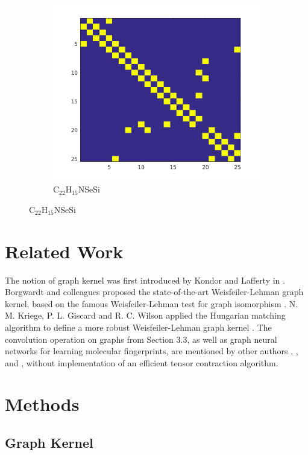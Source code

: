 \documentclass[a4paper]{article}
\begin{document}
\begin{figure}[h]
\begin{subfigure}[h]{0.3\columnwidth}
	\includegraphics[width=\textwidth]{adjacency2}
	\caption{C$_{22}$H$_{15}$NSeSi}
\end{subfigure}
\end{figure}

\section{Related Work}

The notion of graph kernel was first introduced by Kondor and Lafferty in \cite{Risi}. Borgwardt and colleagues proposed the state-of-the-art Weisfeiler-Lehman graph kernel, based on the famous Weisfeiler-Lehman test for graph isomorphism \cite{Nino}. N. M. Kriege, P. L. Giscard and R. C. Wilson applied the Hungarian matching algorithm to define a more robust Weisfeiler-Lehman graph kernel \cite{Nils}. The convolution operation on graphs from Section 3.3, as well as graph neural networks for learning molecular fingerprints, are mentioned by other authors \cite{Steven}, \cite{Duvenaud}, and \cite{Thomas}, without implementation of an efficient tensor contraction algorithm.

\section{Methods}

\subsection{Graph Kernel}
\end{document}

